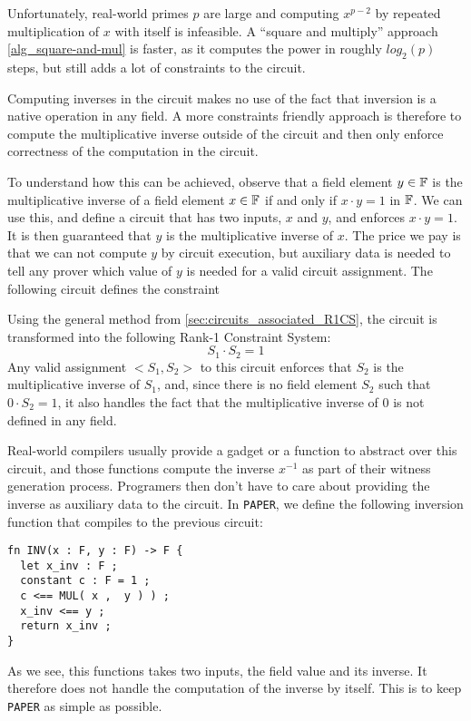 Unfortunately, real-world primes $p$ are large and computing $x^{p-2}$ by repeated multiplication of $x$ with itself is infeasible. A ``square and multiply'' approach \ref{alg_square-and-mul} is faster, as it computes the power in roughly $log_2(p)$ steps, but still adds a lot of constraints to the circuit. 

Computing inverses in the circuit makes no use of the fact that inversion is a native operation in any field. A more constraints friendly approach is therefore to compute the multiplicative inverse outside of the circuit and then only enforce correctness of the computation in the circuit. 

To understand how this can be achieved, observe that a field element $y\in \mathbb{F}$ is the multiplicative inverse of a field element $x\in \mathbb{F}$ if and only if $x\cdot y =1$ in $\mathbb{F}$. We can use this, and define a circuit that has two inputs, $x$ and $y$, and enforces $x\cdot y =1$. It is then guaranteed that $y$ is the multiplicative inverse of $x$. The price we pay is that we can not compute $y$ by circuit execution, but auxiliary data is needed to tell any prover which value of $y$ is needed for a valid circuit assignment.  The following circuit defines the constraint
\begin{center}
\label{circ:inversion}
\end{center}
Using the general method from \ref{sec:circuits_associated_R1CS}, the circuit is transformed into the following Rank-1 Constraint System:
\begin{equation}
S_1 \cdot S_2 = 1
\end{equation}
Any valid assignment $<S_1,S_2>$ to this circuit enforces that $S_2$ is the multiplicative inverse of $S_1$, and, since there is no field element $S_2$ such that $0\cdot S_2=1$, it also handles the fact that the multiplicative inverse of $0$ is not defined in any field. 

Real-world compilers usually provide a gadget or a function to abstract over this circuit, and those functions compute the inverse $x^{-1}$ as part of their witness generation process. Programers then don't have to care about providing the inverse as auxiliary data to the circuit. In \texttt{PAPER}, we define the following inversion function that compiles to the previous circuit:
\begin{lstlisting}
fn INV(x : F, y : F) -> F {
  let x_inv : F ;
  constant c : F = 1 ;
  c <== MUL( x ,  y ) ) ;
  x_inv <== y ;
  return x_inv ;
}
\end{lstlisting}
As we see, this functions takes two inputs, the field value and its inverse. It therefore does not handle the computation of the inverse by itself. This is to keep \texttt{PAPER} as simple as possible. 

